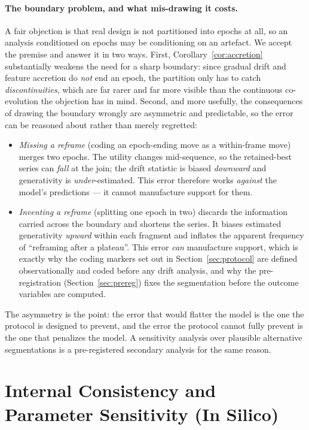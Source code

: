 \documentclass[11pt]{article}
\begin{document}
\paragraph{The boundary problem, and what mis-drawing it costs.} A fair objection is that real design is not partitioned into epochs at all, so an analysis conditioned on epochs may be conditioning on an artefact. We accept the premise and answer it in two ways. First, Corollary~\ref{cor:accretion} substantially weakens the need for a sharp boundary: since gradual drift and feature accretion do \emph{not} end an epoch, the partition only has to catch \emph{discontinuities}, which are far rarer and far more visible than the continuous co-evolution the objection has in mind. Second, and more usefully, the consequences of drawing the boundary wrongly are asymmetric and predictable, so the error can be reasoned about rather than merely regretted:

\begin{itemize}[leftmargin=1.4em, itemsep=2pt, topsep=3pt]
\item \emph{Missing a reframe} (coding an epoch-ending move as a within-frame move) merges two epochs. The utility changes mid-sequence, so the retained-best series can \emph{fall} at the join; the drift statistic is biased \emph{downward} and generativity is \emph{under}-estimated. This error therefore works \emph{against} the model's predictions --- it cannot manufacture support for them.
\item \emph{Inventing a reframe} (splitting one epoch in two) discards the information carried across the boundary and shortens the series. It biases estimated generativity \emph{upward} within each fragment and inflates the apparent frequency of ``reframing after a plateau''. This error \emph{can} manufacture support, which is exactly why the coding markers set out in Section~\ref{sec:protocol} are defined observationally and coded before any drift analysis, and why the pre-registration (Section~\ref{sec:prereg}) fixes the segmentation before the outcome variables are computed.
\end{itemize}

\noindent The asymmetry is the point: the error that would flatter the model is the one the protocol is designed to prevent, and the error the protocol cannot fully prevent is the one that penalizes the model. A sensitivity analysis over plausible alternative segmentations is a pre-registered secondary analysis for the same reason.

\section{Internal Consistency and Parameter Sensitivity (In Silico)}
\label{sec:simulation}
\end{document}
